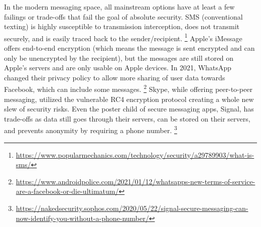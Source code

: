\documentclass[titlepage]{article}
\begin{document}
    In the modern messaging space, all mainstream options have at least a few failings or trade-offs that fail the goal of absolute security.
    SMS (conventional texting) is highly susceptible to transmission interception, does not transmit securely, and is easily traced back to the sender/recipient.
    \footnote{\url{https://www.popularmechanics.com/technology/security/a29789903/what-is-sms/}}
    Apple's iMessage offers end-to-end encryption (which means the message is sent encrypted and can only be unencrypted by the recipient), but the messages are still stored on Apple's servers and are only usable on Apple devices.
    In 2021, WhatsApp changed their privacy policy to allow more sharing of user data towards Facebook, which can include some messages.
    \footnote{\url{https://www.androidpolice.com/2021/01/12/whatsapps-new-terms-of-service-are-a-facebook-or-die-ultimatum/}}
    Skype, while offering peer-to-peer messaging, utilized the vulnerable RC4 encryption protocol creating a whole new slew of security risks.
    Even the poster child of secure messaging apps, Signal, has trade-offs as data still goes through their servers, can be stored on their servers, and prevents anonymity by requiring a phone number.
    \footnote{\url{https://nakedsecurity.sophos.com/2020/05/22/signal-secure-messaging-can-now-identify-you-without-a-phone-number/}}\\
\end{document}

